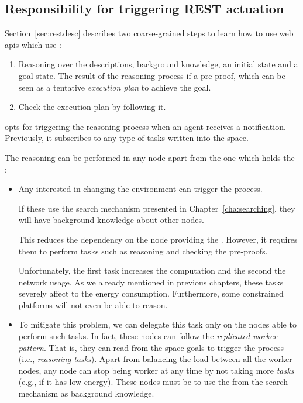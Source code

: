 \subsection{Responsibility for triggering REST actuation}
\label{sec:responsible_proof}

Section~\ref{sec:restdesc} describes two coarse-grained steps to learn how to use web \acsp{api} which use \restdesc{}:
\begin{enumerate}
  \item Reasoning over the descriptions, background knowledge, an initial state and a goal state.
        The result of the reasoning process if a pre-proof, which can be seen as a tentative \emph{execution plan} to achieve the goal.
  \item Check the execution plan by following it.
\end{enumerate}


\implMix{} opts for triggering the reasoning process when an agent receives a notification.
Previously, it subscribes to any type of tasks written into the space.


The reasoning can be performed in any node apart from the one which holds the \Space{}:

\begin{itemize}
  \item Any \consumer{} interested in changing the environment can trigger the process.
	\begin{sloppypar}If these \consumers{} use the search mechanism presented in Chapter~\ref{cha:searching}, they will have background knowledge about other nodes.\end{sloppypar}
	This reduces the dependency on the node providing the \coordspace{}.
	However, it requires them to perform tasks such as reasoning and checking the pre-proofs.
	
	Unfortunately, the first task increases the computation and the second the network usage.
	As we already mentioned in previous chapters, these tasks severely affect to the energy consumption.
	Furthermore, some constrained platforms will not even be able to reason.
	
  \item To mitigate this problem, we can delegate this task only on the nodes able to perform such tasks.
	In fact, these nodes can follow the \emph{replicated-worker pattern}.
	That is, they can read from the space goals to trigger the process (i.e., \emph{reasoning tasks}).
	Apart from balancing the load between all the worker nodes, any node can stop being worker at any time by not taking more \emph{tasks} (e.g., if it has low energy).
	These nodes must be \consumers{} to use the \clues{} from the search mechanism as background knowledge.
\end{itemize}


